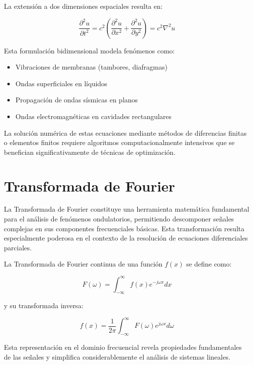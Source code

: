 \documentclass[a4paper]{article}
\begin{document}
La extensión a dos dimensiones espaciales resulta en:

\begin{equation}
\frac{\partial^2 u}{\partial t^2} = c^2 \left(\frac{\partial^2 u}{\partial x^2} + \frac{\partial^2 u}{\partial y^2}\right) = c^2 \nabla^2 u
\end{equation}

Esta formulación bidimensional modela fenómenos como:

\begin{itemize}
\item Vibraciones de membranas (tambores, diafragmas)
\item Ondas superficiales en líquidos
\item Propagación de ondas sísmicas en planos
\item Ondas electromagnéticas en cavidades rectangulares
\end{itemize}

La solución numérica de estas ecuaciones mediante métodos de diferencias finitas o elementos finitos requiere algoritmos computacionalmente intensivos que se benefician significativamente de técnicas de optimización.

\section{Transformada de Fourier}

La Transformada de Fourier constituye una herramienta matemática fundamental para el análisis de fenómenos ondulatorios, permitiendo descomponer señales complejas en sus componentes frecuenciales básicas. Esta transformación resulta especialmente poderosa en el contexto de la resolución de ecuaciones diferenciales parciales.

La Transformada de Fourier continua de una función $f(x)$ se define como:

\begin{equation}
F(\omega) = \int_{-\infty}^{\infty} f(x) e^{-j\omega x} dx
\end{equation}

y su transformada inversa:

\begin{equation}
f(x) = \frac{1}{2\pi} \int_{-\infty}^{\infty} F(\omega) e^{j\omega x} d\omega
\end{equation}

Esta representación en el dominio frecuencial revela propiedades fundamentales de las señales y simplifica considerablemente el análisis de sistemas lineales.
\end{document}
